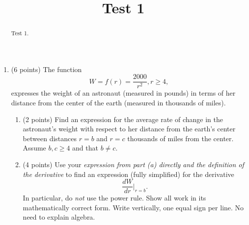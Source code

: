 \documentclass{ximera}
\title{Test 1}
\begin{document}
\begin{abstract}
Test 1.
\end{abstract}
\maketitle

\begin{enumerate}

\item (6 points) The function
\[
        W = f(r) = \frac{2000}{r^2} , r\geq 4 ,
\]
expresses the weight of an astronaut (measured in pounds) in terms of her distance from the center of the earth (measured in thousands of miles).

\begin{enumerate}
\item (2 points) Find an expression for the average rate of change in the astronaut's weight with respect to her distance from the earth's center between distances $r=b$ and $r=c$ thousands of miles from the center. Assume $b,c\geq 4$ and that $b\neq c$.

\item (4 points) Use your \emph{expression from part (a) directly and the definition of the derivative} to find an expression (fully simplified) for the derivative
\[
   \frac{dW}{dr}\Big|_{r=b} .
\]
In particular, do \emph{not} use the power rule. Show all work in its mathematically correct form. Write vertically, one equal sign per line. No need to explain algebra.
\end{enumerate}  


\end{enumerate}
\end{document}
